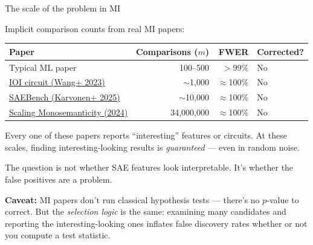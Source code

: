\documentclass[aspectratio=169,11pt]{beamer}
\begin{document}
\begin{frame}{The scale of the problem in MI}

{\small Implicit comparison counts from real MI papers:}

\vspace{0.5em}

{\small
\begin{tabular}{lrrl}
\toprule
\textbf{Paper} & \textbf{Comparisons ($m$)} & \textbf{FWER} & \textbf{Corrected?} \\
\midrule
Typical ML paper & 100--500 & $>$99\% & No \\
\href{https://arxiv.org/abs/2211.00593}{IOI circuit (Wang+ 2023)} & $\sim$1,000 & $\approx$100\% & No \\
\href{https://arxiv.org/abs/2412.13121}{SAEBench (Karvonen+ 2025)} & $\sim$10,000 & $\approx$100\% & No \\
\href{https://transformer-circuits.pub/2024/scaling-monosemanticity/}{Scaling Monosemanticity (2024)} & 34,000,000 & $\approx$100\% & No \\
\bottomrule
\end{tabular}
}

\vspace{0.8em}

{\small Every one of these papers reports ``interesting'' features or circuits. At these scales, finding interesting-looking results is \emph{guaranteed} --- even in random noise.}

\vspace{0.5em}

{\small The question is not whether SAE features look interpretable. It's whether the false positives are a problem.}

\vspace{0.5em}
{\small \textbf{Caveat:} MI papers don't run classical hypothesis tests --- there's no $p$-value to correct. But the \emph{selection logic} is the same: examining many candidates and reporting the interesting-looking ones inflates false discovery rates whether or not you compute a test statistic.}
\end{frame}
\end{document}
